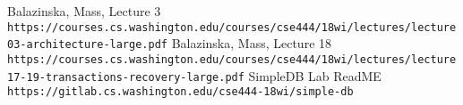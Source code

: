 \documentclass[12pt]{myland}
\begin{document}
\newpage
\begin{thebibliography}{9}
    Balazinska, Mass, Lecture 3
    \\\texttt{https://courses.cs.washington.edu/courses/cse444/18wi/lectures/lecture03-architecture-large.pdf}
    Balazinska, Mass, Lecture 18
    \\\texttt{https://courses.cs.washington.edu/courses/cse444/18wi/lectures/lecture17-19-transactions-recovery-large.pdf}
    SimpleDB Lab ReadME
    \\\texttt{https://gitlab.cs.washington.edu/cse444-18wi/simple-db}


\end{thebibliography}
\end{document}
